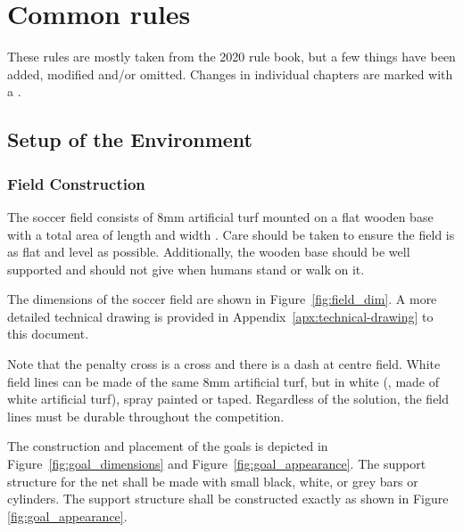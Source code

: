 \section{Common rules}
\label{sec:Common_rules}
These rules are mostly taken from the 2020 rule book, but a few things have been added, modified and/or omitted. Changes in individual chapters are marked with a .

\subsection{Setup of the Environment}
\label{sec:environment_setup}
\subsubsection{Field Construction}
\label{sec:field_dim}

The soccer field consists of 8mm artificial turf mounted on a flat wooden base with a total area of length \TotalLength and width \TotalWidth.  Care should be taken to ensure the field is as flat and level as possible.  Additionally, the wooden base should be well supported and should not give when humans stand or walk on it.

The dimensions of the soccer field are shown in Figure~\ref{fig:field_dim}.
A more detailed technical drawing is provided in Appendix~\ref{apx:technical-drawing} to this document.

 
Note that the penalty cross is a cross and there is a dash at centre field. White field lines can be made of the same 8mm artificial turf, but in white (\ie, made of white artificial turf), spray painted or taped. Regardless of the solution, the field lines must be durable throughout the competition.

The construction and placement of the goals is depicted in Figure~\ref{fig:goal_dimensions} and Figure~\ref{fig:goal_appearance}. The support structure for the net shall be made with small black, white, or grey bars or cylinders. The support structure shall be constructed exactly as shown in Figure \ref{fig:goal_appearance}.


